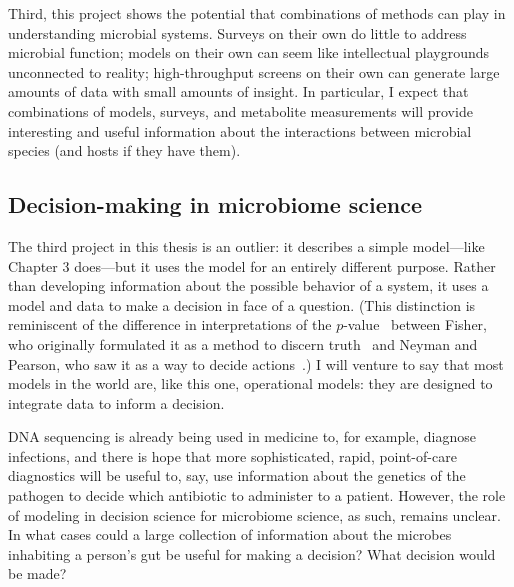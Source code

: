 Third, this project shows the potential that combinations of methods
can play in understanding microbial systems. Surveys on their own
do little to address microbial function; models on their own
can seem like intellectual playgrounds unconnected to reality; high-throughput
screens on their own can generate large amounts of data with small amounts
of insight. In particular, I expect that combinations of models, surveys,
and metabolite measurements will provide interesting and useful
information about the interactions between microbial species (and hosts if
they have them).

\subsection{Decision-making in microbiome science}
The third project in this thesis is an outlier: it describes a
simple model---like Chapter 3 does---but it uses the model for
an entirely different purpose. Rather than developing information
about the possible behavior of a system, it uses a model and data to
make a decision in face of a question. (This distinction is reminiscent
of the difference in interpretations of the $p$-value~\cite{goodman_toward_1999} between Fisher,
who originally formulated it as a method to discern truth~\cite{fisher_statistical_1973}
and Neyman and Pearson, who saw it as a way to decide actions~\cite{neyman_problem_1933}.)
I will venture to say that most models in the world are, like this one,
operational models: they are designed to integrate data to inform a
decision.

DNA sequencing is already being used in medicine to, for example,
diagnose infections, and there is hope that more sophisticated,
rapid, point-of-care diagnostics will be useful to, say, use information
about the genetics of the pathogen to decide
which antibiotic to administer to a patient.
However, the role of modeling in decision science
for microbiome science, as such, remains unclear. In what cases could
a large collection of information about the microbes inhabiting a
person's gut be useful for making a decision? What decision would
be made?

